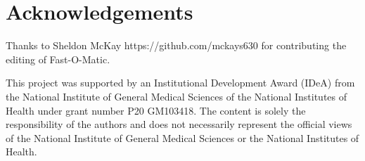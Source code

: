 \section{Acknowledgements}
Thanks to Sheldon McKay https://github.com/mckays630 for contributing the editing of Fast-O-Matic.

This project was supported by an Institutional Development Award (IDeA) from the National Institute of General Medical Sciences of the National Institutes of Health under grant number P20 GM103418. The content is solely the responsibility of the authors and does not necessarily represent the official views of the National Institute of General Medical Sciences or the National Institutes of Health.
